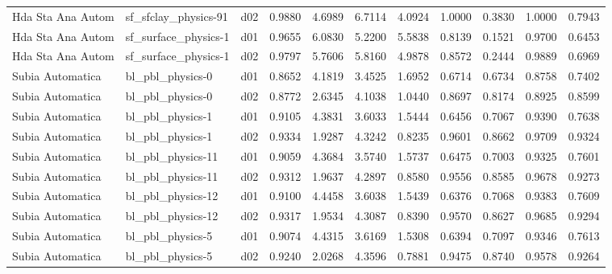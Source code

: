 \begin{longtable}{lllrrrrrrrr}
    Hda Sta Ana Autom  &  sf\_sfclay\_physics-91 &     d02 &   0.9880 &   4.6989 &   6.7114 &       4.0924 &        1.0000 &       0.3830 &           1.0000 &  0.7943 \\
    Hda Sta Ana Autom  &  sf\_surface\_physics-1 &     d01 &   0.9655 &   6.0830 &   5.2200 &       5.5838 &        0.8139 &       0.1521 &           0.9700 &  0.6453 \\
    Hda Sta Ana Autom  &  sf\_surface\_physics-1 &     d02 &   0.9797 &   5.7606 &   5.8160 &       4.9878 &        0.8572 &       0.2444 &           0.9889 &  0.6969 \\
     Subia Automatica  &      bl\_pbl\_physics-0 &     d01 &   0.8652 &   4.1819 &   3.4525 &       1.6952 &        0.6714 &       0.6734 &           0.8758 &  0.7402 \\
     Subia Automatica  &      bl\_pbl\_physics-0 &     d02 &   0.8772 &   2.6345 &   4.1038 &       1.0440 &        0.8697 &       0.8174 &           0.8925 &  0.8599 \\
     Subia Automatica  &      bl\_pbl\_physics-1 &     d01 &   0.9105 &   4.3831 &   3.6033 &       1.5444 &        0.6456 &       0.7067 &           0.9390 &  0.7638 \\
     Subia Automatica  &      bl\_pbl\_physics-1 &     d02 &   0.9334 &   1.9287 &   4.3242 &       0.8235 &        0.9601 &       0.8662 &           0.9709 &  0.9324 \\
     Subia Automatica  &     bl\_pbl\_physics-11 &     d01 &   0.9059 &   4.3684 &   3.5740 &       1.5737 &        0.6475 &       0.7003 &           0.9325 &  0.7601 \\
     Subia Automatica  &     bl\_pbl\_physics-11 &     d02 &   0.9312 &   1.9637 &   4.2897 &       0.8580 &        0.9556 &       0.8585 &           0.9678 &  0.9273 \\
     Subia Automatica  &     bl\_pbl\_physics-12 &     d01 &   0.9100 &   4.4458 &   3.6038 &       1.5439 &        0.6376 &       0.7068 &           0.9383 &  0.7609 \\
     Subia Automatica  &     bl\_pbl\_physics-12 &     d02 &   0.9317 &   1.9534 &   4.3087 &       0.8390 &        0.9570 &       0.8627 &           0.9685 &  0.9294 \\
     Subia Automatica  &      bl\_pbl\_physics-5 &     d01 &   0.9074 &   4.4315 &   3.6169 &       1.5308 &        0.6394 &       0.7097 &           0.9346 &  0.7613 \\
     Subia Automatica  &      bl\_pbl\_physics-5 &     d02 &   0.9240 &   2.0268 &   4.3596 &       0.7881 &        0.9475 &       0.8740 &           0.9578 &  0.9264 \\

\end{longtable}
